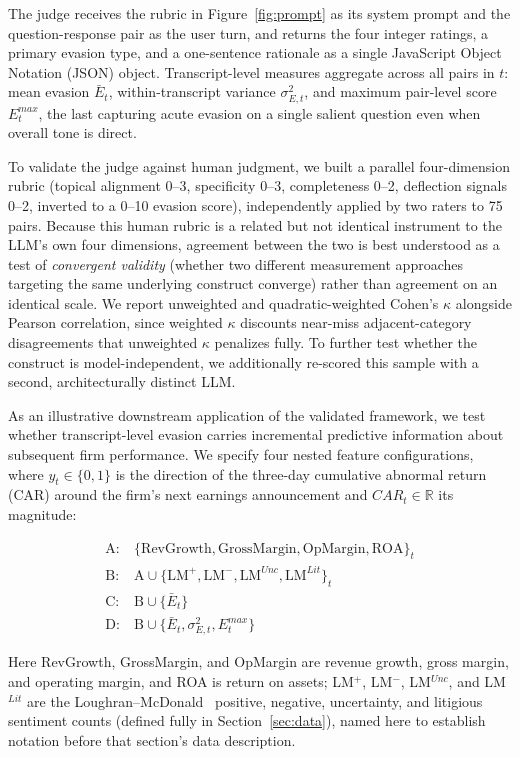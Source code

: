 \documentclass[conference]{IEEEtran}
\begin{document}
The judge receives the rubric in Figure~\ref{fig:prompt} as its system prompt and the question-response pair as the user turn, and returns the four integer ratings, a primary evasion type, and a one-sentence rationale as a single JavaScript Object Notation (JSON) object. Transcript-level measures aggregate across all pairs in $t$: mean evasion $\bar{E}_t$, within-transcript variance $\sigma^2_{E,t}$, and maximum pair-level score $E_t^{max}$, the last capturing acute evasion on a single salient question even when overall tone is direct.

To validate the judge against human judgment, we built a parallel four-dimension rubric (topical alignment 0--3, specificity 0--3, completeness 0--2, deflection signals 0--2, inverted to a 0--10 evasion score), independently applied by two raters to 75 pairs. Because this human rubric is a related but not identical instrument to the LLM's own four dimensions, agreement between the two is best understood as a test of \emph{convergent validity} (whether two different measurement approaches targeting the same underlying construct converge) rather than agreement on an identical scale. We report unweighted and quadratic-weighted Cohen's $\kappa$ alongside Pearson correlation, since weighted $\kappa$ discounts near-miss adjacent-category disagreements that unweighted $\kappa$ penalizes fully. To further test whether the construct is model-independent, we additionally re-scored this sample with a second, architecturally distinct LLM.

As an illustrative downstream application of the validated framework, we test whether transcript-level evasion carries incremental predictive information about subsequent firm performance. We specify four nested feature configurations, where $y_t \in \{0, 1\}$ is the direction of the three-day cumulative abnormal return (CAR) around the firm's next earnings announcement and $CAR_t \in \mathbb{R}$ its magnitude:

\begin{align}
\text{A:}\ & \{\text{RevGrowth}, \text{GrossMargin}, \text{OpMargin}, \text{ROA}\}_t \\
\text{B:}\ & \text{A} \cup \{\text{LM}^+, \text{LM}^-, \text{LM}^{Unc}, \text{LM}^{Lit}\}_t \\
\text{C:}\ & \text{B} \cup \{\bar{E}_t\} \\
\text{D:}\ & \text{B} \cup \{\bar{E}_t, \sigma^2_{E,t}, E_t^{max}\}
\end{align}

Here RevGrowth, GrossMargin, and OpMargin are revenue growth, gross margin, and operating margin, and ROA is return on assets; LM$^+$, LM$^-$, LM$^{Unc}$, and LM$^{Lit}$ are the Loughran--McDonald~\cite{loughran2011liability} positive, negative, uncertainty, and litigious sentiment counts (defined fully in Section~\ref{sec:data}), named here to establish notation before that section's data description.
\end{document}
